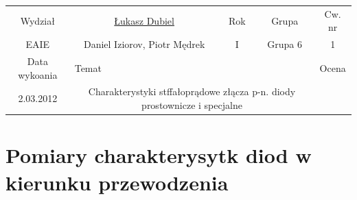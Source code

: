 \documentclass[11pt]{article}
\begin{document}
\begin{center}
\begin{tabular}{|c|c|c|c|c|}
\hline
Wydział & \underline{Łukasz Dubiel} & Rok & Grupa & Cw. nr \\
EAIE & Daniel Iziorov, Piotr Mędrek & I & Grupa 6 & 1 \\
\hline
Data wykoania & \multicolumn{3}{|l|}{Temat} & Ocena \\
2.03.2012 &  \multicolumn{3}{|p{10.5cm}|}{Charakterystyki stffałoprądowe złącza p-n. diody prostownicze i specjalne} & \\
\hline
\end{tabular}
\end{center}

\section{Pomiary charakterysytk diod w kierunku przewodzenia}
\end{document}
